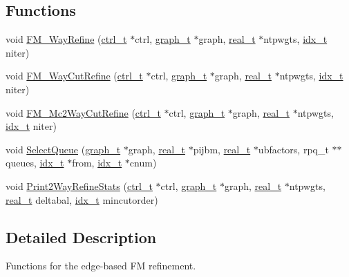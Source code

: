 \subsection*{Functions}
\begin{DoxyCompactItemize}
\item 
void \hyperlink{a00197_a1ffe9ee55eb23e345beb5da3e67c501a}{F\+M\+\_\+Way\+Refine} (\hyperlink{a00742}{ctrl\+\_\+t} $\ast$ctrl, \hyperlink{a00734}{graph\+\_\+t} $\ast$graph, \hyperlink{a00876_a1924a4f6907cc3833213aba1f07fcbe9}{real\+\_\+t} $\ast$ntpwgts, \hyperlink{a00876_aaa5262be3e700770163401acb0150f52}{idx\+\_\+t} niter)
\item 
void \hyperlink{a00197_a1c215aad2804a5cba2e54e93113bc0d5}{F\+M\+\_\+Way\+Cut\+Refine} (\hyperlink{a00742}{ctrl\+\_\+t} $\ast$ctrl, \hyperlink{a00734}{graph\+\_\+t} $\ast$graph, \hyperlink{a00876_a1924a4f6907cc3833213aba1f07fcbe9}{real\+\_\+t} $\ast$ntpwgts, \hyperlink{a00876_aaa5262be3e700770163401acb0150f52}{idx\+\_\+t} niter)
\item 
void \hyperlink{a00197_aaa49d065f964af00512da0c4b3d4cad6}{F\+M\+\_\+\+Mc2\+Way\+Cut\+Refine} (\hyperlink{a00742}{ctrl\+\_\+t} $\ast$ctrl, \hyperlink{a00734}{graph\+\_\+t} $\ast$graph, \hyperlink{a00876_a1924a4f6907cc3833213aba1f07fcbe9}{real\+\_\+t} $\ast$ntpwgts, \hyperlink{a00876_aaa5262be3e700770163401acb0150f52}{idx\+\_\+t} niter)
\item 
void \hyperlink{a00197_a51193f4b76d298d94234642136879390}{Select\+Queue} (\hyperlink{a00734}{graph\+\_\+t} $\ast$graph, \hyperlink{a00876_a1924a4f6907cc3833213aba1f07fcbe9}{real\+\_\+t} $\ast$pijbm, \hyperlink{a00876_a1924a4f6907cc3833213aba1f07fcbe9}{real\+\_\+t} $\ast$ubfactors, rpq\+\_\+t $\ast$$\ast$queues, \hyperlink{a00876_aaa5262be3e700770163401acb0150f52}{idx\+\_\+t} $\ast$from, \hyperlink{a00876_aaa5262be3e700770163401acb0150f52}{idx\+\_\+t} $\ast$cnum)
\item 
void \hyperlink{a00197_a6e4663b4acc63be2c1b33533e7827f1a}{Print2\+Way\+Refine\+Stats} (\hyperlink{a00742}{ctrl\+\_\+t} $\ast$ctrl, \hyperlink{a00734}{graph\+\_\+t} $\ast$graph, \hyperlink{a00876_a1924a4f6907cc3833213aba1f07fcbe9}{real\+\_\+t} $\ast$ntpwgts, \hyperlink{a00876_a1924a4f6907cc3833213aba1f07fcbe9}{real\+\_\+t} deltabal, \hyperlink{a00876_aaa5262be3e700770163401acb0150f52}{idx\+\_\+t} mincutorder)
\end{DoxyCompactItemize}


\subsection{Detailed Description}
Functions for the edge-\/based FM refinement. 

